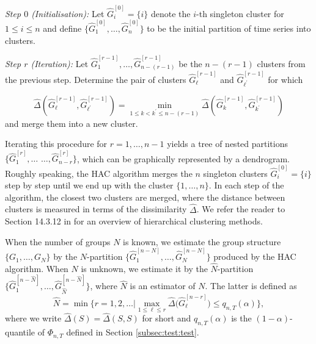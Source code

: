 \documentclass[a4paper,12pt]{article}
\begin{document}
\noindent \textit{Step $0$ (Initialisation):} Let $\widehat{G}_i^{[0]} = \{ i \}$ denote the $i$-th singleton cluster for $1 \le i \le n$ and define $\{\widehat{G}_1^{[0]},\ldots,\widehat{G}_n^{[0]} \}$ to be the initial partition of time series into clusters. 
\vspace{5pt}

\noindent \textit{Step $r$ (Iteration):} Let $\widehat{G}_1^{[r-1]},\ldots,\widehat{G}_{n-(r-1)}^{[r-1]}$ be the $n-(r-1)$ clusters from the previous step. Determine the pair of clusters $\widehat{G}_{\ell}^{[r-1]}$ and $\widehat{G}_{{\ell}^\prime}^{[r-1]}$ for which 

\[ \widehat{\Delta}(\widehat{G}_{\ell}^{[r-1]},\widehat{G}_{{\ell}^\prime}^{[r-1]}) = \min_{1 \le k < k^\prime \le n-(r-1)} \widehat{\Delta}(\widehat{G}_{k}^{[r-1]},\widehat{G}_{k^\prime}^{[r-1]}) \]  
and merge them into a new cluster. 
\vspace{10pt}

\noindent Iterating this procedure for $r = 1,\ldots, n-1$ yields a tree of nested partitions \linebreak $\{\widehat{G}_1^{[r]},\ldots$ $\ldots,\widehat{G}_{n-r}^{[r]}\}$, which can be graphically represented by a dendrogram. Roughly speaking, the HAC algorithm merges the $n$ singleton clusters $\widehat{G}_i^{[0]} = \{ i \}$ step by step until we end up with the cluster $\{1,\ldots, n\}$. In each step of the algorithm, the closest two clusters are merged, where the distance between clusters is measured in terms of the dissimilarity $\widehat{\Delta}$. We refer the reader to Section 14.3.12 in \cite{HastieTibshiraniFriedman2009} for an overview of hierarchical clustering methods. 


When the number of groups $N$ is known, we estimate the group structure $\{G_1,\ldots, G_N\}$ by the $N$-partition $\{\widehat{G}_1^{[n-N]},\ldots,\widehat{G}_{N}^{[n-N]}\}$ produced by the HAC algorithm. When $N$ is unknown, we estimate it by the $\widehat{N}$-partition $\{\widehat{G}_1^{[n-\widehat{N}]},\ldots,\widehat{G}_{\widehat{N}}^{[n-\widehat{N}]}\}$, where $\widehat{N}$ is an estimator of $N$. The latter is defined as 
\[ \widehat{N} = \min \Big\{ r = 1,2,\ldots \Big| \max_{1 \le \ell \le r} \widehat{\Delta} \big( \widehat{G}_\ell^{[n-r]} \big) \le q_{n,T}(\alpha) \Big\}, \]
where we write $\widehat{\Delta}(S) = \widehat{\Delta}(S,S)$ for short and $q_{n,T}(\alpha)$ is the $(1-\alpha)$-quantile of $\Phi_{n,T}$ defined in Section \ref{subsec:test:test}. 
\end{document}
